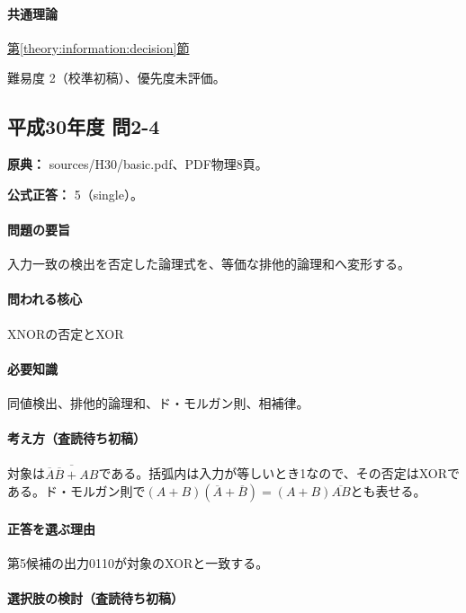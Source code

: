 \paragraph{共通理論} \hyperref[theory:information:decision]{第\ref*{theory:information:decision}節}

\par 難易度 2（校準初稿）、優先度未評価。

\subsection{平成30年度 問2-4}
\label{q:h30-reg-basic-2-4}

\noindent\textbf{原典：} sources/H30/basic.pdf、PDF物理8頁。

\textbf{公式正答：} 5（single）。

\paragraph{問題の要旨} 入力一致の検出を否定した論理式を、等価な排他的論理和へ変形する。

\paragraph{問われる核心} XNORの否定とXOR

\paragraph{必要知識} 同値検出、排他的論理和、ド・モルガン則、相補律。

\paragraph{考え方（査読待ち初稿）} 対象は\(\overline{\overline A\overline B+AB}\)である。括弧内は入力が等しいとき1なので、その否定はXORである。ド・モルガン則で\((A+B)(\overline A+\overline B)=(A+B)\overline{AB}\)とも表せる。

\paragraph{正答を選ぶ理由} 第5候補の出力0110が対象のXORと一致する。

\paragraph{選択肢の検討（査読待ち初稿）}\mbox{}\par

